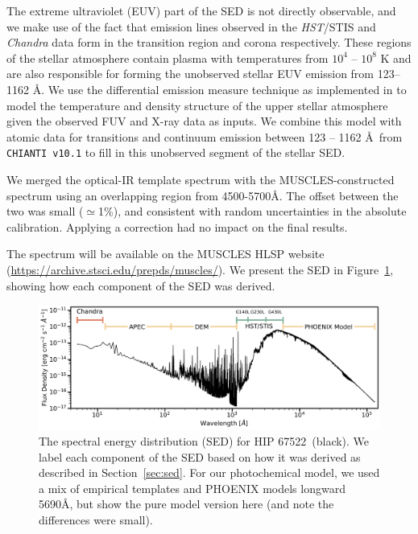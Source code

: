 \documentclass[twocolumn]{aastex63} %
\newcommand{\hst}{\textit{HST}}
\newcommand{\starname}{HIP 67522}
\begin{document}
The extreme ultraviolet (EUV) part of the SED is not directly observable, and we make use of the fact that emission lines observed in the \hst/STIS and \textit{Chandra} data form in the transition region and corona respectively. These regions of the stellar atmosphere contain plasma with temperatures from $10^4$ -- $10^8$ K and are also responsible for forming the unobserved stellar EUV emission from 123--1162 \AA. We use the differential emission measure technique as implemented in \citet{Duvvuri:2021, Duvvuri:2023} to model the temperature and density structure of the upper stellar atmosphere given the observed FUV and X-ray data as inputs. We combine this model with atomic data for transitions and continuum emission between 123 -- 1162 \AA\, from \texttt{CHIANTI v10.1} \citep{Dere1999, DelZanna:2021} to fill in this unobserved segment of the stellar SED. 

We merged the optical-IR template spectrum with the MUSCLES-constructed spectrum using an overlapping region from 4500-5700\AA. The offset between the two was small ($\simeq$1\%), and consistent with random uncertainties in the absolute calibration. Applying a correction had no impact on the final results. 

The spectrum will be available on the MUSCLES HLSP website (\url{https://archive.stsci.edu/prepds/muscles/}). We present the SED in Figure~\ref{fig:sed}, showing how each component of the SED was derived.


\begin{figure}[ht]
    \centering
    \includegraphics[width=\textwidth]{sed_hip67522b.pdf}
    \caption{The spectral energy distribution (SED) for \starname\, (black). We label each component of the SED based on how it was derived as described in Section~\ref{sec:sed}. For our photochemical model, we used a mix of empirical templates and PHOENIX models longward 5690\AA, but show the pure model version here (and note the differences were small).
    \label{fig:sed}}
\end{figure} 
\end{document}
